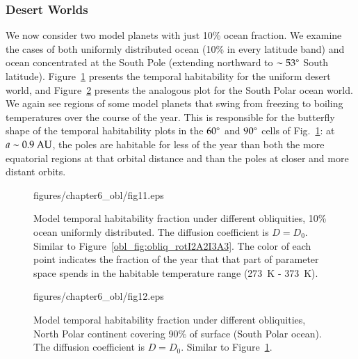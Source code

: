 \afterpage{\clearpage}

\subsubsection{Desert Worlds}
\label{obl_sssec:desert}

We now consider two model planets with just 10\% ocean fraction.  We
examine the cases of both uniformly distributed ocean (10\% in every
latitude band) and ocean concentrated at the South Pole (extending
northward to $\sim 53\mbox{$^\circ$}$ South latitude).
Figure~\ref{obl_fig:set25_obliq} presents the temporal habitability
for the uniform desert world, and Figure~\ref{obl_fig:set28_obliq}
presents the analogous plot for the South Polar ocean world.  We again
see regions of some model planets that swing from freezing to boiling
temperatures over the course of the year.  This is responsible for the
butterfly shape of the temporal habitability plots in the $60\mbox{$^\circ$}$
and $90\mbox{$^\circ$}$ cells of Fig.~\ref{obl_fig:set25_obliq}: at $a\sim
0.9\rm~AU$, the poles are habitable for less of the year than both the
more equatorial regions at that orbital distance and than the poles at
closer and more distant orbits.

\begin{figure}[p]
\plotone
{figures/chapter6_obl/fig11.eps}
\caption[Model temporal habitability fraction under different
obliquities, 10\% ocean uniformly distributed.]{Model temporal
habitability fraction under different obliquities, 10\% ocean
uniformly distributed.  The diffusion coefficient is $D=D_0$.  Similar
to Figure~\ref{obl_fig:obliq_rotI2A2I3A3}.  The color of each point
indicates the fraction of the year that that part of parameter space
spends in the habitable temperature range (273~K - 373~K).}
\label{obl_fig:set25_obliq}
\end{figure}

\afterpage{\clearpage}

\begin{figure}[p]
\plotone
{figures/chapter6_obl/fig12.eps}
\caption[Model temporal habitability fraction under different
obliquities, North Polar continent covering 90\% of surface (South
Polar ocean).]{Model temporal habitability fraction under different
obliquities, North Polar continent covering 90\% of surface (South
Polar ocean).  The diffusion coefficient is $D=D_0$.  Similar to
Figure~\ref{obl_fig:set25_obliq}.}
\label{obl_fig:set28_obliq}
\end{figure}

\afterpage{\clearpage}

